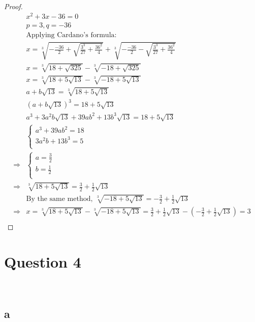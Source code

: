 \documentclass{article}
\begin{document}
~

\begin{proof}
    \begin{align*}
        &x^2+3x-36=0\\
        &p=3,q=-36\\
        &\text{Applying Cardano's formula}:\\
        &x=\sqrt[3]{-\frac{-36}{2}+\sqrt{\frac{3^3}{27}+\frac{36^2}{4}}}+\sqrt[3]{-\frac{-36}{2}-\sqrt{\frac{3^3}{27}+\frac{36^2}{4}}}\\
        &x=\sqrt[3]{18+\sqrt{325}}-\sqrt[3]{-18+\sqrt{325}}\\
        &x=\sqrt[3]{18+5\sqrt{13}}-\sqrt[3]{-18+5\sqrt{13}}\\
        &a+b\sqrt{13}=\sqrt[3]{18+5\sqrt{13}}\\
        &(a+b\sqrt{13})^3=18+5\sqrt{13}\\
        &a^3+3a^2b\sqrt{13}+39ab^2+13b^3\sqrt{13}=18+5\sqrt{13}\\
        &\begin{cases}
            a^3+39ab^2=18\\
            3a^2b+13b^3=5\\
        \end{cases}\\
        \Rightarrow&\begin{cases}
            a=\frac{3}{2}\\
            b=\frac{1}{2}\\
        \end{cases}\\
        \Rightarrow&\sqrt[3]{18+5\sqrt{13}}=\frac{3}{2}+\frac{1}{2}\sqrt{13}\\
        &\text{By the same method, }\sqrt[3]{-18+5\sqrt{13}}=-\frac{3}{2}+\frac{1}{2}\sqrt{13}\\
        \Rightarrow&x=\sqrt[3]{18+5\sqrt{13}}-\sqrt[3]{-18+5\sqrt{13}}=\frac{3}{2}+\frac{1}{2}\sqrt{13}-(-\frac{3}{2}+\frac{1}{2}\sqrt{13})=3\\
    \end{align*}
\end{proof}

\newpage

\section*{Question 4}

~

\subsection*{a}
\end{document}
